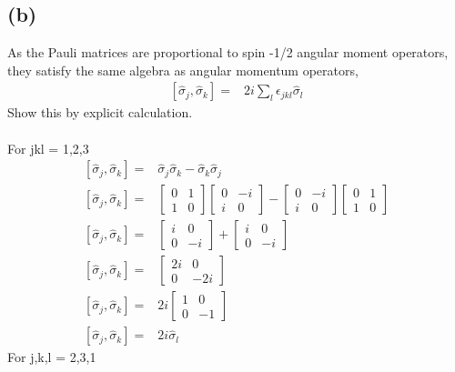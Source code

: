 \documentclass[12pt, a4paper]{article}
\begin{document}
\subsection*{(b)}
 As the Pauli matrices are proportional to spin -1/2 angular moment operators, they satisfy the same algebra as angular momentum operators,
\begin{align*}
\left[\hat{\sigma}_j,\hat{\sigma}_k\right] =& 2i\sum_l \epsilon_{jkl}\hat{\sigma}_l
\end{align*}
Show this by explicit calculation.\\
\\
For jkl = 1,2,3
\begin{align*}
\left[\hat{\sigma}_j,\hat{\sigma}_k\right] =& 
\hat{\sigma}_j\hat{\sigma}_k - \hat{\sigma}_k\hat{\sigma}_j
\\
\left[\hat{\sigma}_j,\hat{\sigma}_k\right] =&
\begin{bmatrix}0&1\\1&0\end{bmatrix}
\begin{bmatrix}0&-i\\i&0\end{bmatrix} -
\begin{bmatrix}0&-i\\i&0\end{bmatrix}
\begin{bmatrix}0&1\\1&0\end{bmatrix}
\\
\left[\hat{\sigma}_j,\hat{\sigma}_k\right] =&
\begin{bmatrix}i&0\\0&-i\end{bmatrix} +
\begin{bmatrix}i&0\\0&-i\end{bmatrix} 
\\
\left[\hat{\sigma}_j,\hat{\sigma}_k\right] =&
\begin{bmatrix}2i&0\\ 0&-2i\end{bmatrix}
\\
\left[\hat{\sigma}_j,\hat{\sigma}_k\right] =&
2i\begin{bmatrix}1&0\\ 0&-1\end{bmatrix}
\\
\left[\hat{\sigma}_j,\hat{\sigma}_k\right] =&
2i\hat{\sigma}_l
\end{align*}
For j,k,l = 2,3,1
\end{document}
